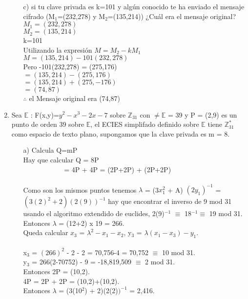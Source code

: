 \documentclass[11pt,letterpaper]{article}
\newcounter{neq}
\begin{document}
\begin{enumerate}
\begin{itemize}
\item[c)] si tu clave privada es k=101 y algún conocido te ha enviado el mensaje cifrado (M$_1$=(232,278) y M$_2$=(135,214)) ¿Cuál era el mensaje original?\\
$M_1=(232,278)$\\
$M_2=(135,214)$\\
k=101\\
Utilizando la expresión $M=M_2 - kM_1$\\
$M=(135,214)-101(232,278)$\\
Pero  -101(232,278) = (275,176)\\
$=(135,214)-(275,176)$\\
$=(135,214)+(275,-176)$\\
$=(74,87)$\\
$\therefore$ el Mensaje original era (74,87)\\
\end{itemize}
\item Sea $\mathbb{E}$ : F(x,y)=$y^{2}-x^{3}-2x-7$ sobre $\mathbb{Z}_{31}$ con $\neq \mathbb{E}$ = 39 y P = (2,9) es un punto de orden 39 sobre $\mathbb{E}$, el ECIES simplifado definido sobre $\mathbb{E}$ tiene $\mathbb{Z}^{*}_{31}$ como espacio de texto plano, supongamos que la clave privada es m = 8.
\begin{itemize}
\item[a)] Calcula Q=mP\\
Hay que calcular Q = 8P\\$ ~~~~~~~~~~~~~~~~~~~~~~~~~~~$= 4P + 4P = (2P+2P) + (2P+2P)\\\\
Como son los mismos puntos tenemos $\lambda$ = (3$x_{1}^{2}$ + A) $(2y_{1})^{-1}$ = $(3(2)^{2} + 2)(2(9))^{-1}$ hay que encontrar el inverso de 9 mod 31 usando el algoritmo extendido de euclides, 2(9)$^{-1}$ $\equiv$ 18$^{-1} \equiv $ 19 mod 31.\\
Entonces $\lambda$ = (12+2) x 19 = 266.\\
Queda calcular $x_{3}$ = $\lambda^{2} - x_{1} - x_{2}$, y$_3$ = $\lambda(x_{1} - x_{3}) - y_{1}$.
\\
\\x$_{3}$ = $(266)^{2}$ - 2 - 2 = 70,756-4 = 70,752 $\equiv$ 10 mod 31.
\\y$_{3}$ = 266(2-70752) - 9 = -18,819,509 $\equiv$  2 mod 31.\\
Entonces 2P = (10,2).\\
4P = 2P + 2P =  (10,2)+(10,2).\\
Entonces $\lambda$ = (3(10$^{2}$) + 2)(2(2)$)^{-1}$ = 2,416.\\

\end{itemize}
\end{enumerate}
\end{document}
